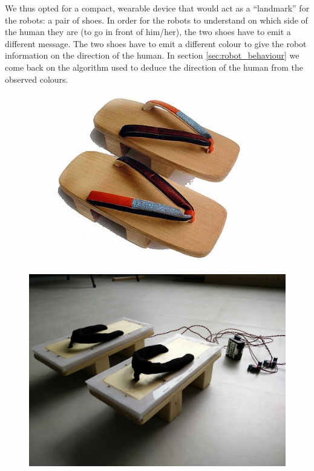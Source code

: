\documentclass[oneside, a4paper, 12pt]{memoir}
\begin{document}
	We thus opted for a compact, wearable device that would act as a \enquote{landmark} for the robots: a pair of shoes. In order for the robots to understand on which side of the human they are (to go in front of him/her), the two shoes have to emit a different message. The two shoes have to emit a different colour to give the robot information on the direction of the human. In section \ref{sec:robot_behaviour} we come back on the algorithm used to deduce the direction of the human from the observed colours.
	

	
	\begin{figure}[!htp]
		\begin{minipage}[c]{0.49\textwidth}
			\includegraphics[width=\textwidth]{images/512px-Geta.jpg}
		\end{minipage}
		\hfill
		\begin{minipage}[c]{0.49\textwidth}
			\includegraphics[width=\textwidth]{images/shoes2.jpg}
		\end{minipage}
		

\end{figure}
\end{document}
